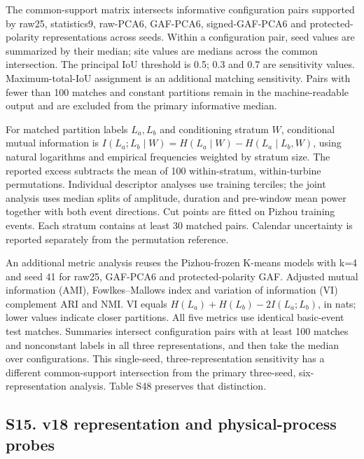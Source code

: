 \documentclass[a4paper,11pt]{article}
\begin{document}
The common-support matrix intersects informative configuration pairs supported by raw25, statistics9, raw-PCA6, GAF-PCA6, signed-GAF-PCA6 and protected-polarity representations across seeds. Within a configuration pair, seed values are summarized by their median; site values are medians across the common intersection. The principal IoU threshold is 0.5; 0.3 and 0.7 are sensitivity values. Maximum-total-IoU assignment is an additional matching sensitivity. Pairs with fewer than 100 matches and constant partitions remain in the machine-readable output and are excluded from the primary informative median.

For matched partition labels \(L_a,L_b\) and conditioning stratum \(W\), conditional mutual information is \(I(L_a;L_b\mid W)=H(L_a\mid W)-H(L_a\mid L_b,W)\), using natural logarithms and empirical frequencies weighted by stratum size. The reported excess subtracts the mean of 100 within-stratum, within-turbine permutations. Individual descriptor analyses use training terciles; the joint analysis uses median splits of amplitude, duration and pre-window mean power together with both event directions. Cut points are fitted on Pizhou training events. Each stratum contains at least 30 matched pairs. Calendar uncertainty is reported separately from the permutation reference.

An additional metric analysis reuses the Pizhou-frozen K-means models with k=4 and seed 41 for raw25, GAF-PCA6 and protected-polarity GAF. Adjusted mutual information (AMI), Fowlkes--Mallows index and variation of information (VI) complement ARI and NMI. VI equals \(H(L_a)+H(L_b)-2I(L_a;L_b)\), in nats; lower values indicate closer partitions. All five metrics use identical basic-event test matches. Summaries intersect configuration pairs with at least 100 matches and nonconstant labels in all three representations, and then take the median over configurations. This single-seed, three-representation sensitivity has a different common-support intersection from the primary three-seed, six-representation analysis. Table S48 preserves that distinction.

\subsection{S15. v18 representation and physical-process probes}\label{s15.-v18-representation-and-physical-process-probes}
\end{document}
